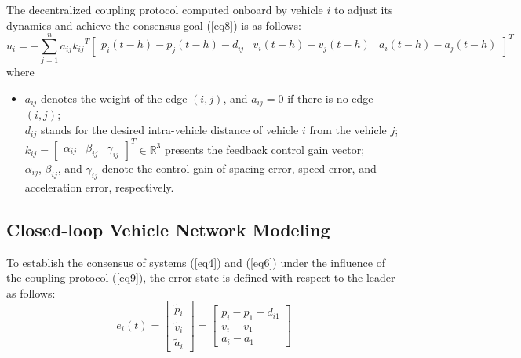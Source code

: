 \documentclass[a4paper]{cas-sc}
\begin{document}
The decentralized coupling protocol computed onboard by vehicle $i$ to adjust its dynamics and achieve the consensus goal (\ref{eq8}) is as follows:
\begin{equation}
  {u_i} =  - \sum\limits_{j = 1}^n {{a_{ij}}{k_{ij}}^T{{\left[ {\begin{array}{*{20}{c}}
              {{p_i}\left( {t - {h}} \right) - {p_j}\left( {t - {h}} \right) - {d_{ij}}} & {{v_i}\left( {t - {h}} \right) - {v_j}\left( {t - {h}} \right)} & {{a_i}\left( {t - {h}} \right) - {a_j}\left( {t - {h}} \right)}
            \end{array}} \right]}^T}}
  \label{eq9}
\end{equation}
where
\begin{itemize}
  \item[]
    ${a_{ij}}$ denotes the weight of the edge $\left( {i,j} \right)$, and ${a_{ij}} = 0$ if there is no edge $\left( {i,j} \right)$;                     \\
    ${d_{ij}}$ stands for the desired intra-vehicle distance of vehicle $i$ from the vehicle $j$;                                                        \\
    ${k_{ij}} = {\left[ {\begin{array}{*{20}{c}}
              {{\alpha _{ij}}} & {{\beta _{ij}}} & {{\gamma _{ij}}}
            \end{array}} \right]^T} \in {\mathbb{R}^{3}}$ presents the feedback control gain vector;                         \\
    ${\alpha _{ij}}$, ${\beta _{ij}}$, and ${\gamma _{ij}}$ denote the control gain of spacing error, speed error, and acceleration error, respectively.
\end{itemize}




\subsection{Closed-loop Vehicle Network Modeling}
\label{Section 3.2}

To establish the consensus of systems (\ref{eq4}) and (\ref{eq6}) under the influence of the coupling protocol (\ref{eq9}), the error state is defined with respect to the leader as follows:
\begin{equation}
  {e_i}\left( t \right) = \left[ {\begin{array}{*{20}{c}}
          {{{\tilde p}_i}} \\
          {{{\tilde v}_i}} \\
          {{{\tilde a}_i}}
        \end{array}} \right] = \left[ {\begin{array}{*{20}{c}}
          {{p_i} - {p_1} - {d_{i1}}} \\
          {{v_i} - {v_1}}            \\
          {{a_i} - {a_1}}
        \end{array}} \right]
  \label{eq10}
\end{equation}
\end{document}
